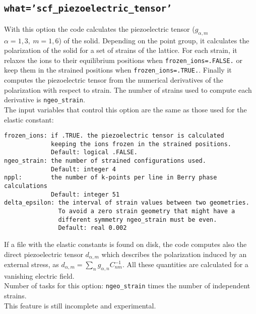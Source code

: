 \documentclass[12pt,a4paper]{article}
\begin{document}
\subsection{\texttt{what='scf\_piezoelectric\_tensor'}}
With this option the code calculates the piezoelectric tensor 
($g_{\alpha,m}$ $\alpha=1,3,\ m=1,6$) of the solid.
Depending on the point group, it calculates the polarization of the
solid for a set of strains of the lattice. For each strain, it relaxes 
the ions to their equilibrium positions when \texttt{frozen\_ions=.FALSE.} 
or keep them in the strained positions when \texttt{frozen\_ions=.TRUE.}. 
Finally it computes the piezoelectric tensor from the numerical derivatives 
of the polarization with respect to strain.
The number of strains used to compute each derivative 
is \texttt{ngeo\_strain}.\\
The input variables
that control this option are the same as those used for the elastic constant:
\begin{verbatim}
frozen_ions: if .TRUE. the piezoelectric tensor is calculated 
             keeping the ions frozen in the strained positions. 
             Default: logical .FALSE.
ngeo_strain: the number of strained configurations used. 
             Default: integer 4
nppl:        the number of k-points per line in Berry phase calculations
             Default: integer 51
delta_epsilon: the interval of strain values between two geometries.
               To avoid a zero strain geometry that might have a
               different symmetry ngeo_strain must be even.
               Default: real 0.002
\end{verbatim}
If a file with the elastic constants is found on disk, the code computes also
the direct piezoelectric tensor $d_{\alpha,m}$ which describes
the polarization induced by an external stress, as $d_{\alpha,m}=
\sum_n g_{\alpha,n} C_{nm}^{-1}$. All these quantities are calculated 
for a vanishing electric field. \\
Number of tasks for this option: \texttt{ngeo\_strain} times the number of
independent strains. \\
This feature is still incomplete and experimental.
\end{document}
